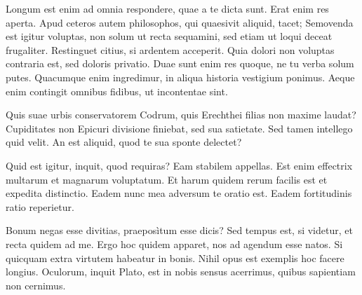 \documentclass[12pt,twoside]{article}
\begin{document}
	Longum est enim ad omnia respondere, quae a te dicta sunt. Erat enim res aperta. Apud ceteros autem philosophos, qui quaesivit aliquid, tacet; Semovenda est igitur voluptas, non solum ut recta sequamini, sed etiam ut loqui deceat frugaliter. Restinguet citius, si ardentem acceperit. Quia dolori non voluptas contraria est, sed doloris privatio. Duae sunt enim res quoque, ne tu verba solum putes. Quacumque enim ingredimur, in aliqua historia vestigium ponimus. Aeque enim contingit omnibus fidibus, ut incontentae sint.
	
	Quis suae urbis conservatorem Codrum, quis Erechthei filias non maxime laudat? Cupiditates non Epicuri divisione finiebat, sed sua satietate. Sed tamen intellego quid velit. An est aliquid, quod te sua sponte delectet?
	
	Quid est igitur, inquit, quod requiras? Eam stabilem appellas. Est enim effectrix multarum et magnarum voluptatum. Et harum quidem rerum facilis est et expedita distinctio. Eadem nunc mea adversum te oratio est. Eadem fortitudinis ratio reperietur.
	
	Bonum negas esse divitias, praeposìtum esse dicis? Sed tempus est, si videtur, et recta quidem ad me. Ergo hoc quidem apparet, nos ad agendum esse natos. Si quicquam extra virtutem habeatur in bonis. Nihil opus est exemplis hoc facere longius. Oculorum, inquit Plato, est in nobis sensus acerrimus, quibus sapientiam non cernimus.
\end{document}
